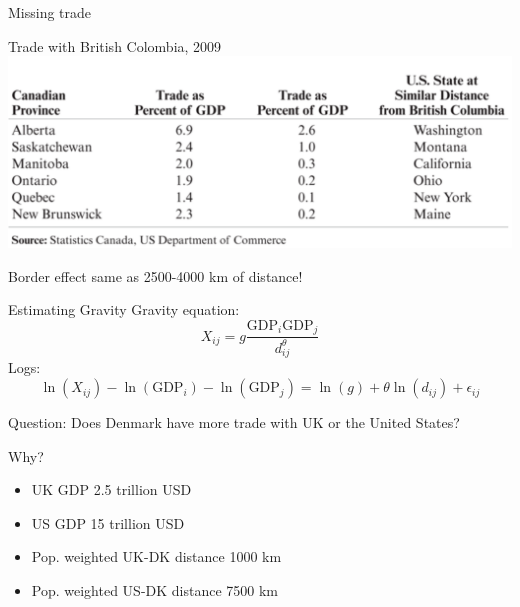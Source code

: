 \documentclass[ignorenonframetext,]{beamer}
\begin{document}
\begin{frame}{Missing trade}

    Trade with British Colombia, 2009 
    \includegraphics[scale=0.30]{canada_us_trade.png}

    Border effect same as 2500-4000 km of distance!

\end{frame}

\begin{frame}{Estimating Gravity}
    Gravity equation:
        \begin{equation*}
            X_{ij} = g \frac{\mbox{GDP}_i \mbox{GDP}_j}{d_{ij}^\theta}
        \end{equation*}
    Logs:
        \begin{equation*}
            \ln(X_{ij}) - \ln(\mbox{GDP}_i) - \ln(\mbox{GDP}_j) = \ln (g) + \theta \ln (d_{ij}) + \epsilon_{ij}
        \end{equation*}
\end{frame}

\begin{frame}

    Question: Does Denmark have more trade with UK or the United States?

    Why?

\end{frame}

\begin{frame}

    \begin{itemize}
        \item UK GDP 2.5 trillion USD
        \item US GDP 15 trillion USD
    \end{itemize}

    \begin{itemize}
        \item Pop. weighted UK-DK distance 1000 km
        \item Pop. weighted US-DK distance 7500 km 
    \end{itemize}

\end{frame}
\end{document}
